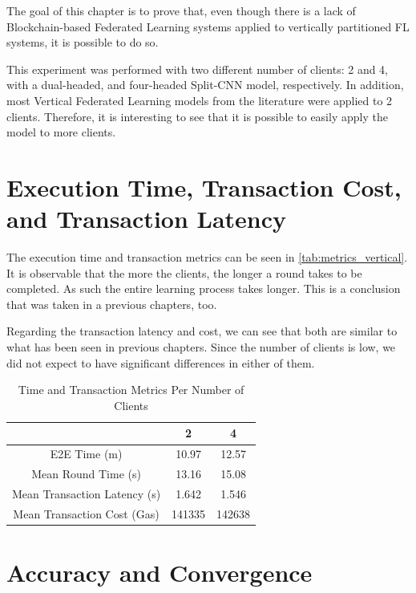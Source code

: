 The goal of this chapter is to prove that, even though there is a lack of Blockchain-based Federated Learning systems applied to vertically partitioned FL systems, it is possible to do so.

This experiment was performed with two different number of clients: 2 and 4, with a dual-headed, and four-headed Split-CNN model, respectively. In addition, most Vertical Federated Learning models from the literature were applied to 2 clients. Therefore, it is interesting to see that it is possible to easily apply the model to more clients.

\section{Execution Time, Transaction Cost, and Transaction Latency}

The execution time and transaction metrics can be seen in \autoref{tab:metrics_vertical}. It is observable that the more the clients, the longer a round takes to be completed. As such the entire learning process takes longer. This is a conclusion that was taken in a previous chapters, too.

Regarding the transaction latency and cost, we can see that both are similar to what has been seen in previous chapters. Since the number of clients is low, we did not expect to have significant differences in either of them.

\begin{table}[!ht]
\begin{tabular}{c|c|c} \hline \hline
                                & 2             & 4             \\ \hline \hline
E2E Time (m)                    & 10.97	        & 12.57         \\ \hline
Mean Round Time (s)             & 13.16	        & 15.08         \\ \hline
Mean Transaction Latency (s)    & 1.642	        & 1.546         \\ \hline
Mean Transaction Cost (Gas)     & 141335        & 142638        \\ \hline
\end{tabular}
\caption{Time and Transaction Metrics Per Number of Clients}
\label{tab:metrics_vertical}
\end{table}

\section{Accuracy and Convergence}

